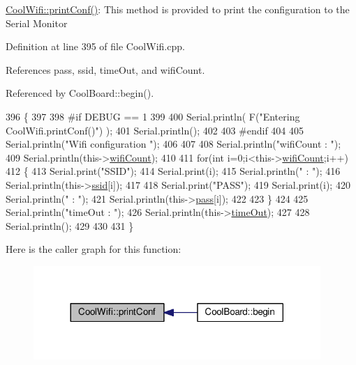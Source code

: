 \hyperlink{classCoolWifi_a9e6105c6d13d35ec510f6633da9e0223}{Cool\+Wifi\+::print\+Conf()}\+: This method is provided to print the configuration to the Serial Monitor 

Definition at line 395 of file Cool\+Wifi.\+cpp.



References pass, ssid, time\+Out, and wifi\+Count.



Referenced by Cool\+Board\+::begin().


\begin{DoxyCode}
396 \{
397 
398 \textcolor{preprocessor}{#if DEBUG == 1 }
399 
400     Serial.println( F(\textcolor{stringliteral}{"Entering CoolWifi.printConf()"}) );
401     Serial.println();   
402 
403 \textcolor{preprocessor}{#endif}
404     
405     Serial.println(\textcolor{stringliteral}{"Wifi configuration "});
406 
407     
408     Serial.println(\textcolor{stringliteral}{"wifiCount : "});
409     Serial.println(this->\hyperlink{classCoolWifi_ab133bd92fcb895b884deecd6678592e4}{wifiCount});
410     
411     \textcolor{keywordflow}{for}(\textcolor{keywordtype}{int} i=0;i<this->\hyperlink{classCoolWifi_ab133bd92fcb895b884deecd6678592e4}{wifiCount};i++)
412     \{   
413         Serial.print(\textcolor{stringliteral}{"SSID"});
414         Serial.print(i);
415         Serial.println(\textcolor{stringliteral}{" : "});
416         Serial.println(this->\hyperlink{classCoolWifi_a893b21d0fed821438733bba2e73fb4c2}{ssid}[i]);
417                 
418         Serial.print(\textcolor{stringliteral}{"PASS"});
419         Serial.print(i);
420         Serial.println(\textcolor{stringliteral}{" : "});
421         Serial.println(this->\hyperlink{classCoolWifi_a0c3332a149245aaad060b32593a54c9b}{pass}[i]);
422         
423     \}
424     
425     Serial.println(\textcolor{stringliteral}{"timeOut : "});
426     Serial.println(this->\hyperlink{classCoolWifi_a952111605f25156588b5632caaba1c6f}{timeOut});
427 
428     Serial.println();
429 
430 
431 \}
\end{DoxyCode}
Here is the caller graph for this function\+:\nopagebreak
\begin{figure}[H]
\begin{center}
\leavevmode
\includegraphics[width=308pt]{classCoolWifi_a9e6105c6d13d35ec510f6633da9e0223_icgraph}
\end{center}
\end{figure}
\mbox{\label{classCoolWifi_a1c7b4d82a4098d346e7593dce92039fa}} 

